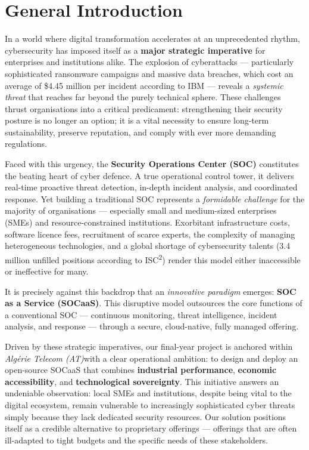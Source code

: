 \chapter*{General Introduction}

In a world where digital transformation accelerates at an unprecedented rhythm, cybersecurity has imposed itself as a \textbf{major strategic imperative} for enterprises and institutions alike. The explosion of cyberattacks --- particularly sophisticated ransomware campaigns and massive data breaches, which cost an average of \$4.45 million per incident according to IBM --- reveals a \textit{systemic threat} that reaches far beyond the purely technical sphere. These challenges thrust organisations into a critical predicament: strengthening their security posture is no longer an option; it is a vital necessity to ensure long-term sustainability, preserve reputation, and comply with ever more demanding regulations.

Faced with this urgency, the \textbf{Security Operations Center (SOC)} constitutes the beating heart of cyber defence. A true operational control tower, it delivers real-time proactive threat detection, in-depth incident analysis, and coordinated response. Yet building a traditional SOC represents a \textit{formidable challenge} for the majority of organisations --- especially small and medium-sized enterprises (SMEs) and resource-constrained institutions. Exorbitant infrastructure costs, software licence fees, recruitment of scarce experts, the complexity of managing heterogeneous technologies, and a global shortage of cybersecurity talents (3.4 million unfilled positions according to ISC\textsuperscript{2}) render this model either inaccessible or ineffective for many.

It is precisely against this backdrop that an \textit{innovative paradigm} emerges: \textbf{SOC as a Service (SOCaaS)}. This disruptive model outsources the core functions of a conventional SOC --- continuous monitoring, threat intelligence, incident analysis, and response --- through a secure, cloud-native, fully managed offering.

Driven by these strategic imperatives, our final-year project is anchored within \textit{Algérie Telecom (AT)}with a clear operational ambition: to design and deploy an open-source SOCaaS that combines \textbf{industrial performance}, \textbf{economic accessibility}, and \textbf{technological sovereignty}. This initiative answers an undeniable observation: local SMEs and institutions, despite being vital to the digital ecosystem, remain vulnerable to increasingly sophisticated cyber threats simply because they lack dedicated security resources. Our solution positions itself as a credible alternative to proprietary offerings --- offerings that are often ill-adapted to tight budgets and the specific needs of these stakeholders.

